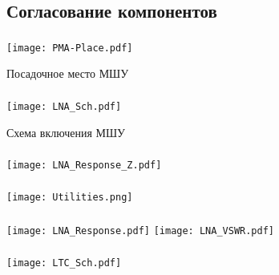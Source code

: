 \documentclass[c]{beamer}  %
\begin{document}
\subsection{Согласование компонентов}
	\begin{frame}
		\frametitle{\insertsection}
		\framesubtitle{\insertsubsection}
		\centering
		\texttt{[image: PMA-Place.pdf]}
		
		\vfill
		Посадочное место МШУ
		
	\end{frame}

	\begin{frame}
		\frametitle{\insertsection}
		\framesubtitle{\insertsubsection}
		\centering
		\hspace*{-0.075\textwidth}%
		\texttt{[image: LNA\_Sch.pdf]}
		
		\vfill 
		Схема включения МШУ
	\end{frame}


	\begin{frame}
		\frametitle{\insertsection}
		\framesubtitle{\insertsubsection}
		\centering
		\hspace*{-0.05\textwidth}%
		\texttt{[image: LNA\_Response\_Z.pdf]}
		
	\end{frame}
	
	\begin{frame}
		\frametitle{\insertsection}
		\framesubtitle{\insertsubsection}
		\centering
		\hspace*{-0.075\textwidth}%
		\texttt{[image: Utilities.png]}
		
	\end{frame}

	\begin{frame}
		\frametitle{\insertsection}
		\framesubtitle{\insertsubsection}
		\centering
		\hspace*{-0.075\textwidth}%
		\texttt{[image: LNA\_Response.pdf]}%
		\texttt{[image: LNA\_VSWR.pdf]}
	\end{frame}
	
	\begin{frame}
		\frametitle{\insertsection}
		\framesubtitle{\insertsubsection}
		\centering
		\texttt{[image: LTC\_Sch.pdf]}
		
	\end{frame}
\end{document}
